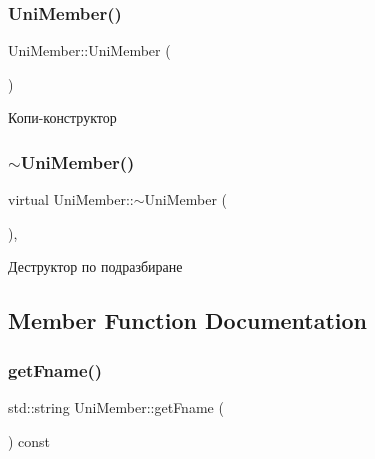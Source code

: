 \mbox{\label{class_uni_member_a3a13cd99a8ccb8349350728bbb5db627}} 
\subsubsection{\texorpdfstring{Uni\+Member()}{UniMember()}\hspace{0.1cm}{\footnotesize\ttfamily [3/3]}}
{\footnotesize\ttfamily Uni\+Member\+::\+Uni\+Member (\begin{DoxyParamCaption}\item[{const \hyperlink{class_uni_member}{Uni\+Member} \&}]{ }\end{DoxyParamCaption})}



Копи-\/конструктор 

\mbox{\label{class_uni_member_a6b68bae0efeb222dc9613ebe84870331}} 
\subsubsection{\texorpdfstring{$\sim$\+Uni\+Member()}{~UniMember()}}
{\footnotesize\ttfamily virtual Uni\+Member\+::$\sim$\+Uni\+Member (\begin{DoxyParamCaption}{ }\end{DoxyParamCaption})\hspace{0.3cm}{\ttfamily [virtual]}, {\ttfamily [default]}}



Деструктор по подразбиране 



\subsection{Member Function Documentation}
\mbox{\label{class_uni_member_ae954a856ad320eff703c3efe312ebece}} 
\subsubsection{\texorpdfstring{get\+Fname()}{getFname()}}
{\footnotesize\ttfamily std\+::string Uni\+Member\+::get\+Fname (\begin{DoxyParamCaption}{ }\end{DoxyParamCaption}) const}

